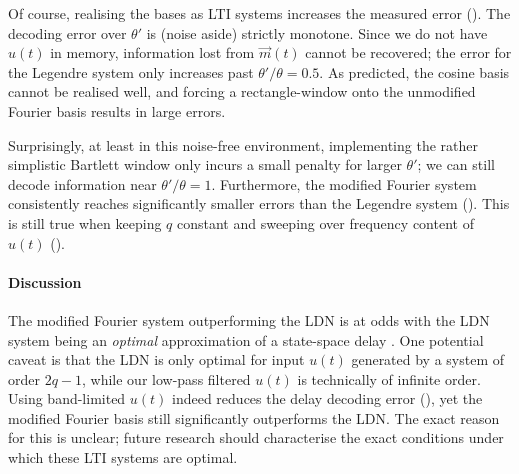 Of course, realising the bases as LTI systems increases the measured error ().
The decoding error over $\theta'$ is (noise aside) strictly monotone.
Since we do not have $u(t)$ in memory, information lost from $\vec m(t)$ cannot be recovered; the error for the Legendre system only increases past $\theta' / \theta = 0.5$.
As predicted, the cosine basis cannot be realised well, and forcing a rectangle-window onto the unmodified Fourier basis results in large errors.

Surprisingly, at least in this noise-free environment, implementing the rather simplistic Bartlett window only incurs a small penalty for larger $\theta'$; we can still decode information near $\theta' / \theta = 1$.
Furthermore, the modified Fourier system consistently reaches significantly smaller errors than the Legendre system ().
This is still true when keeping $q$ constant and sweeping over frequency content of $u(t)$ ().

\paragraph{Discussion}
The modified Fourier system outperforming the LDN is at odds with the LDN system being an \emph{optimal} approximation of a state-space delay \citep[Section~6.1.1]{voelker2019}.
One potential caveat is that the LDN is only optimal for input $u(t)$ generated by a system of order $2q - 1$, while our low-pass filtered $u(t)$ is technically of infinite order.
Using band-limited $u(t)$ indeed reduces the delay decoding error (), yet the modified Fourier basis still significantly outperforms the LDN.
The exact reason for this is unclear; future research should characterise the exact conditions under which these LTI systems are optimal.
